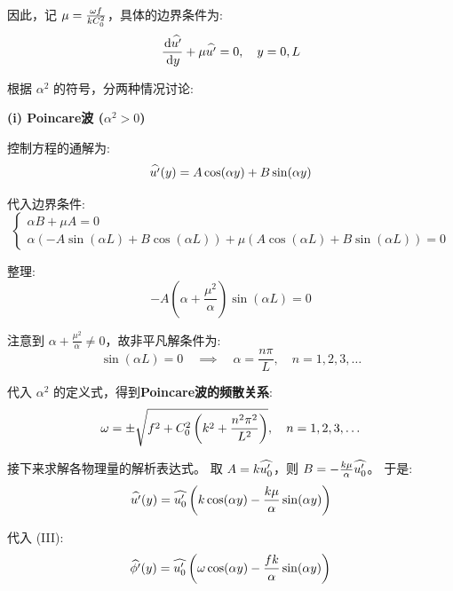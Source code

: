 \begin{enumerate}
    因此，记 $\mu = \frac{\omega f}{k C_0^2}$，具体的边界条件为:
    \begin{equation*}
        \ode{\complexamp{u^\prime}}{y} + \mu \complexamp{u^\prime} = 0, \quad y = 0, L
    \end{equation*}

    根据 $\alpha^2$ 的符号，分两种情况讨论:

    \textbf{(i) Poincare波 ($\alpha^2 > 0$)}

    控制方程的通解为:
    \begin{equation*}
        \widehat{u^\prime}(y) = A \cos(\alpha y) + B \sin(\alpha y)
    \end{equation*}

    代入边界条件:
    \begin{equation*}
        \begin{cases}
            \alpha B + \mu A = 0 \\
            \alpha (-A \sin(\alpha L) + B \cos(\alpha L)) + \mu (A \cos(\alpha L) + B \sin(\alpha L)) = 0
        \end{cases}
    \end{equation*}

    整理:
    \begin{equation*}
        -A (\alpha + \frac{\mu^2}{\alpha}) \sin(\alpha L) = 0
    \end{equation*}

    注意到 $\alpha + \frac{\mu^2}{\alpha} \ne 0$，故非平凡解条件为:
    \begin{equation*}
        \sin(\alpha L) = 0 \quad  \implies \quad  \alpha = \frac{n\pi}{L}, \quad n = 1, 2, 3, \ldots
    \end{equation*}

    代入 $\alpha^2$ 的定义式，得到\textbf{Poincare波的频散关系}:
    \begin{equation*}
        \omega = \pm \sqrt{f^2 + C_0^2 \left(k^2 + \frac{n^2 \pi^2}{L^2}\right)}, \quad n = 1, 2, 3, \ldots
    \end{equation*}

    接下来求解各物理量的解析表达式。
    取 $A = k \widehat{u_0^\prime}$，则 $B = -\frac{k \mu}{\alpha} \widehat{u_0^\prime}$。
    于是:
    \begin{equation*}
        \widehat{u^\prime}(y) = \widehat{u_0^\prime} \left(k \cos(\alpha y) - \frac{k \mu}{\alpha} \sin(\alpha y)\right)
    \end{equation*}

    代入 (III):
    \begin{equation*}
        \widehat{\phi^\prime}(y) = \widehat{u_0^\prime} \left(\omega \cos(\alpha y) - \frac{f k}{\alpha} \sin(\alpha y)\right)
    \end{equation*}


\end{enumerate}
